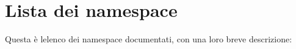 \section{Lista dei namespace}
Questa è l\textquotesingle{}elenco dei namespace documentati, con una loro breve descrizione\+:\begin{DoxyCompactList}
\item{}
\end{DoxyCompactList}
